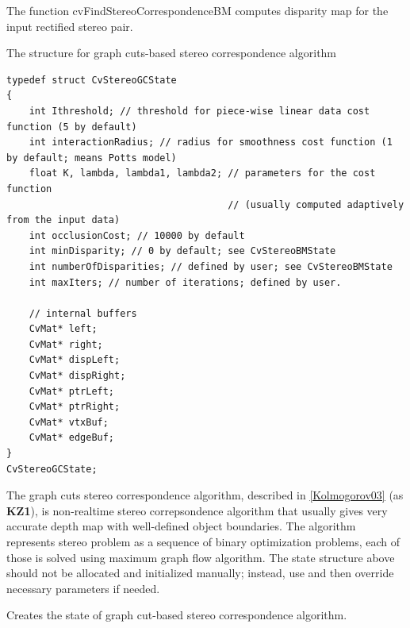 \begin{description}
\end{description}

The function cvFindStereoCorrespondenceBM computes disparity map for the input rectified stereo pair.


The structure for graph cuts-based stereo correspondence algorithm

\begin{lstlisting}
typedef struct CvStereoGCState
{
    int Ithreshold; // threshold for piece-wise linear data cost function (5 by default)
    int interactionRadius; // radius for smoothness cost function (1 by default; means Potts model)
    float K, lambda, lambda1, lambda2; // parameters for the cost function
                                       // (usually computed adaptively from the input data)
    int occlusionCost; // 10000 by default
    int minDisparity; // 0 by default; see CvStereoBMState
    int numberOfDisparities; // defined by user; see CvStereoBMState
    int maxIters; // number of iterations; defined by user.

    // internal buffers
    CvMat* left;
    CvMat* right;
    CvMat* dispLeft;
    CvMat* dispRight;
    CvMat* ptrLeft;
    CvMat* ptrRight;
    CvMat* vtxBuf;
    CvMat* edgeBuf;
}
CvStereoGCState;
\end{lstlisting}

The graph cuts stereo correspondence algorithm, described in \href{\#Kolmogrov03}{[Kolmogorov03]} (as \textbf{KZ1}), is non-realtime stereo correpsondence algorithm that usually gives very accurate depth map with well-defined object boundaries. The algorithm represents stereo problem as a sequence of binary optimization problems, each of those is solved using maximum graph flow algorithm. The state structure above should not be allocated and initialized manually; instead, use  and then override necessary parameters if needed.


Creates the state of graph cut-based stereo correspondence algorithm.

